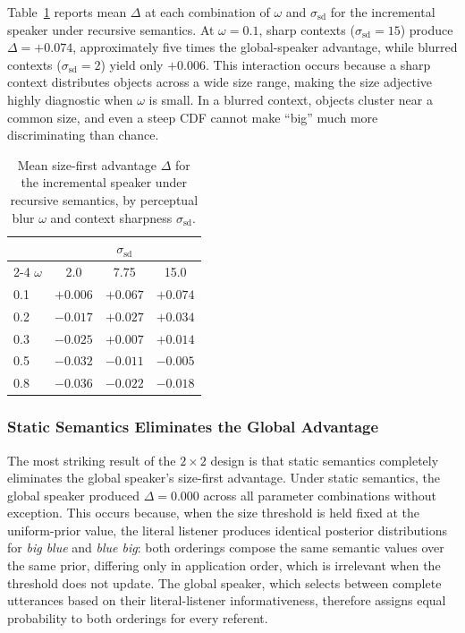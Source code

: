 Table~\ref{tab:wf-sd} reports mean $\Delta$ at each combination of
$\omega$ and $\sigma_{\text{sd}}$ for the incremental speaker under
recursive semantics.
At $\omega = 0.1$, sharp contexts ($\sigma_{\text{sd}} = 15$) produce
$\Delta = +0.074$, approximately five times the global-speaker advantage,
while blurred contexts ($\sigma_{\text{sd}} = 2$) yield only $+0.006$.
This interaction occurs because a sharp context distributes objects
across a wide size range, making the size adjective highly diagnostic
when $\omega$ is small.
In a blurred context, objects cluster near a common size, and even a
steep CDF cannot make ``big'' much more discriminating than chance.

\begin{table}[h]
\centering
\small
\caption{Mean size-first advantage $\Delta$ for the incremental speaker
  under recursive semantics,
  by perceptual blur $\omega$ and context sharpness $\sigma_{\text{sd}}$.}
\label{tab:wf-sd}
\begin{tabular}{lccc}
\toprule
 & \multicolumn{3}{c}{$\sigma_{\text{sd}}$} \\
\cmidrule(lr){2-4}
$\omega$ & 2.0 & 7.75 & 15.0 \\
\midrule
0.1 & $+0.006$ & $+0.067$ & $+0.074$ \\
0.2 & $-0.017$ & $+0.027$ & $+0.034$ \\
0.3 & $-0.025$ & $+0.007$ & $+0.014$ \\
0.5 & $-0.032$ & $-0.011$ & $-0.005$ \\
0.8 & $-0.036$ & $-0.022$ & $-0.018$ \\
\bottomrule
\end{tabular}
\end{table}

\subsubsection{Static Semantics Eliminates the Global Advantage}

The most striking result of the $2 \times 2$ design is that static
semantics completely eliminates the global speaker's size-first advantage.
Under static semantics, the global speaker produced $\Delta = 0.000$
across all parameter combinations without exception.
This occurs because, when the size threshold is held fixed at the
uniform-prior value, the literal listener produces identical posterior
distributions for \textit{big blue} and \textit{blue big}: both orderings
compose the same semantic values over the same prior, differing only in
application order, which is irrelevant when the threshold does not update.
The global speaker, which selects between complete utterances based on
their literal-listener informativeness, therefore assigns equal probability
to both orderings for every referent.

